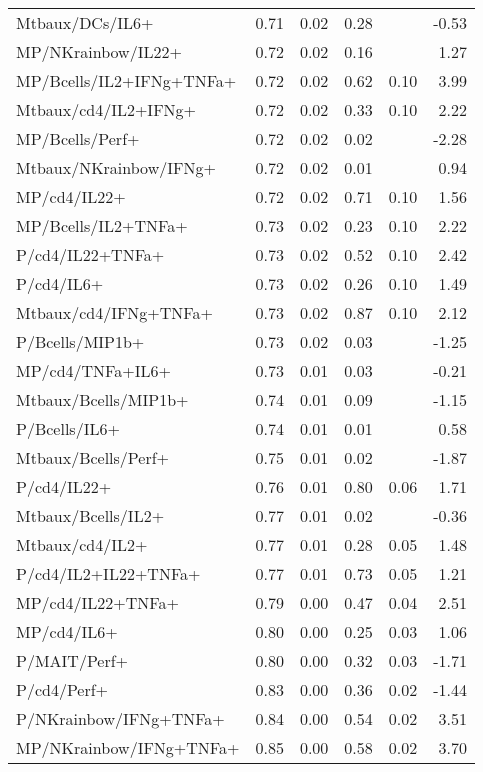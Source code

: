 \documentclass{article}
\begin{document}
\begin{table}[ht]
\begin{tabular}{lrrrrr}
  Mtbaux/DCs/IL6+ & 0.71 & 0.02 & 0.28 &  & -0.53 \\ 
  MP/NKrainbow/IL22+ & 0.72 & 0.02 & 0.16 &  & 1.27 \\ 
  MP/Bcells/IL2+IFNg+TNFa+ & 0.72 & 0.02 & 0.62 & 0.10 & 3.99 \\ 
  Mtbaux/cd4/IL2+IFNg+ & 0.72 & 0.02 & 0.33 & 0.10 & 2.22 \\ 
  MP/Bcells/Perf+ & 0.72 & 0.02 & 0.02 &  & -2.28 \\ 
  Mtbaux/NKrainbow/IFNg+ & 0.72 & 0.02 & 0.01 &  & 0.94 \\ 
  MP/cd4/IL22+ & 0.72 & 0.02 & 0.71 & 0.10 & 1.56 \\ 
  MP/Bcells/IL2+TNFa+ & 0.73 & 0.02 & 0.23 & 0.10 & 2.22 \\ 
  P/cd4/IL22+TNFa+ & 0.73 & 0.02 & 0.52 & 0.10 & 2.42 \\ 
  P/cd4/IL6+ & 0.73 & 0.02 & 0.26 & 0.10 & 1.49 \\ 
  Mtbaux/cd4/IFNg+TNFa+ & 0.73 & 0.02 & 0.87 & 0.10 & 2.12 \\ 
  P/Bcells/MIP1b+ & 0.73 & 0.02 & 0.03 &  & -1.25 \\ 
  MP/cd4/TNFa+IL6+ & 0.73 & 0.01 & 0.03 &  & -0.21 \\ 
  Mtbaux/Bcells/MIP1b+ & 0.74 & 0.01 & 0.09 &  & -1.15 \\ 
  P/Bcells/IL6+ & 0.74 & 0.01 & 0.01 &  & 0.58 \\ 
  Mtbaux/Bcells/Perf+ & 0.75 & 0.01 & 0.02 &  & -1.87 \\ 
  P/cd4/IL22+ & 0.76 & 0.01 & 0.80 & 0.06 & 1.71 \\ 
  Mtbaux/Bcells/IL2+ & 0.77 & 0.01 & 0.02 &  & -0.36 \\ 
  Mtbaux/cd4/IL2+ & 0.77 & 0.01 & 0.28 & 0.05 & 1.48 \\ 
  P/cd4/IL2+IL22+TNFa+ & 0.77 & 0.01 & 0.73 & 0.05 & 1.21 \\ 
  MP/cd4/IL22+TNFa+ & 0.79 & 0.00 & 0.47 & 0.04 & 2.51 \\ 
  MP/cd4/IL6+ & 0.80 & 0.00 & 0.25 & 0.03 & 1.06 \\ 
  P/MAIT/Perf+ & 0.80 & 0.00 & 0.32 & 0.03 & -1.71 \\ 
  P/cd4/Perf+ & 0.83 & 0.00 & 0.36 & 0.02 & -1.44 \\ 
  P/NKrainbow/IFNg+TNFa+ & 0.84 & 0.00 & 0.54 & 0.02 & 3.51 \\ 
  MP/NKrainbow/IFNg+TNFa+ & 0.85 & 0.00 & 0.58 & 0.02 & 3.70 \\ 
   \hline
\end{tabular}
\end{table}
\end{document}
